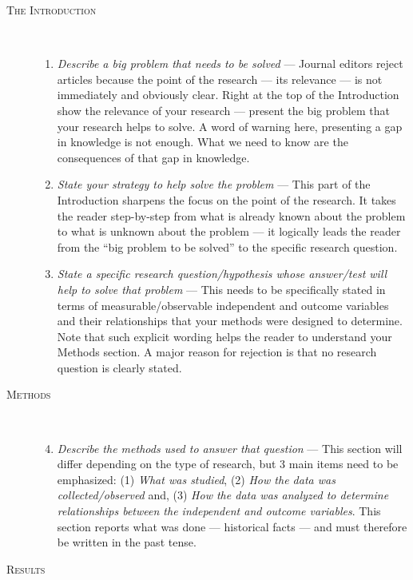 \documentclass[graybox,envcountchap,sectrefs,UStrade]{svmono}
\begin{document}
\begin{description}
  \item[\textsc{The Introduction}] \hfill \\
      \begin{enumerate}
      \item \emph{Describe a big problem that needs to be solved} --- Journal editors reject articles because the point of the research --- its relevance --- is not immediately and obviously clear. Right at the top of the Introduction show the relevance of your research --- present the big problem that your research helps to solve. A word of warning here, presenting a gap in knowledge is not enough. What we need to know are the consequences of that gap in knowledge.
      \item \emph{State your strategy to help solve the problem} --- This part of the Introduction sharpens the focus on the point of the research. It takes the reader step-by-step from what is already known about the problem to what is unknown about the problem --- it logically leads the reader from the ``big problem to be solved'' to the specific research question.
      \item \emph{State a specific research question/hypothesis whose answer/test will help to solve that problem} --- This needs to be specifically stated in terms of measurable/observable independent and outcome variables and their relationships that your methods were designed to determine. Note that such explicit wording helps the reader to understand your Methods section. A major reason for rejection is that no research question is clearly stated.
    \end{enumerate}
\item[\textsc{Methods}] \hfill \\
      \begin{enumerate}
      \setcounter{enumi}{3}
      \item \emph{Describe the methods used to answer that question} --- This section will differ depending on the type of research, but 3 main items need to be emphasized: (1) \emph{What was studied}, (2) \emph{How the data was collected/observed} and, (3) \emph{How the data was analyzed to determine relationships between the independent and outcome variables}. This section reports what was done --- historical facts --- and must therefore be written in the past tense.
      \end{enumerate}
\item[\textsc{Results}] \hfill \\

\end{description}
\end{document}
